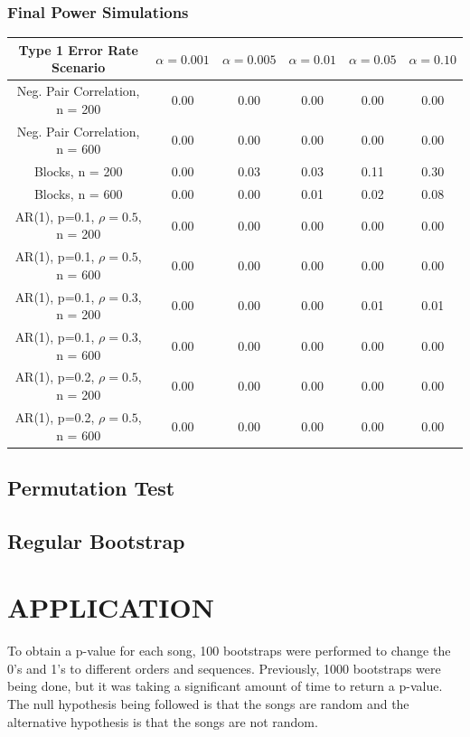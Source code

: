 \documentclass[12pt, letterpaper]{article}
\begin{document}
\subsubsection{Final Power Simulations}
\begin{tabular}{|c|c|c|c|c|c|}
\hline
\textbf{Type 1 Error Rate Scenario} & $\alpha = 0.001$ &  $\alpha = 0.005$ &  $\alpha = 0.01$ &  $\alpha = 0.05$ &  $\alpha = 0.10$ \\
\hline
Neg. Pair Correlation, n = 200 & 0.00 & 0.00 & 0.00 & 0.00 & 0.00 \\
\hline
Neg. Pair Correlation, n = 600 & 0.00 & 0.00 & 0.00 & 0.00 & 0.00 \\
\hline
Blocks, n = 200 & 0.00 & 0.03 & 0.03 & 0.11 & 0.30 \\
\hline
Blocks, n = 600 & 0.00 & 0.00 & 0.01 & 0.02 & 0.08 \\
\hline
AR(1), p=0.1, $\rho = 0.5$, n = 200 & 0.00 & 0.00 & 0.00 & 0.00 & 0.00 \\
\hline
AR(1), p=0.1, $\rho = 0.5$, n = 600 & 0.00 & 0.00 & 0.00 & 0.00 & 0.00 \\
\hline
AR(1), p=0.1, $\rho = 0.3$, n = 200 & 0.00 & 0.00 & 0.00 & 0.01 & 0.01 \\
\hline
AR(1), p=0.1, $\rho = 0.3$, n = 600 & 0.00 & 0.00 & 0.00 & 0.00 & 0.00 \\
\hline
AR(1), p=0.2, $\rho = 0.5$, n = 200 & 0.00 & 0.00 & 0.00 & 0.00 & 0.00 \\
\hline
AR(1), p=0.2, $\rho = 0.5$, n = 600 & 0.00 & 0.00 & 0.00 & 0.00 & 0.00 \\
\hline
\end{tabular}

\subsection{Permutation Test}
\subsection{Regular Bootstrap}


\section{APPLICATION}
To obtain a p-value for each song, 100 bootstraps were performed to change the 0's and 1's to different orders and sequences.  Previously, 1000 bootstraps were being done, but it was taking a significant amount of time to return a p-value.  The null hypothesis being followed is that the songs are random and the alternative hypothesis is that the songs are not random. 
\end{document}

